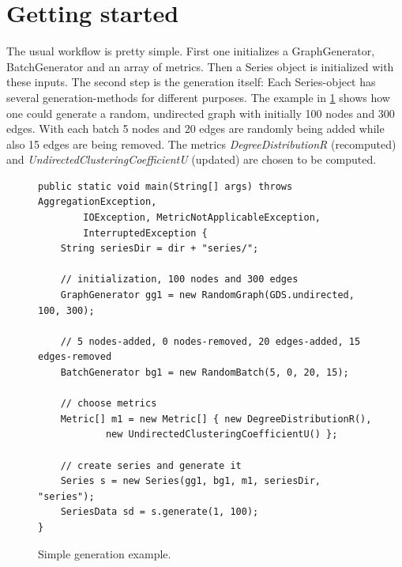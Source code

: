 \section{Getting started}
The usual workflow is pretty simple. First one initializes a GraphGenerator, BatchGenerator and an array of metrics. Then a Series object is initialized with these inputs. The second step is the generation itself: Each Series-object has several generation-methods for different purposes. The example in \ref{code:example1} shows how one could generate a random, undirected graph with initially 100 nodes and 300 edges. With each batch 5 nodes and 20 edges are randomly being added while also 15 edges are being removed. The metrics \textit{DegreeDistributionR} (recomputed) and \textit{UndirectedClusteringCoefficientU} (updated) are chosen to be computed. 

\begin{figure} [h]
\begin{lstlisting}
public static void main(String[] args) throws AggregationException,
		IOException, MetricNotApplicableException,
		InterruptedException {
	String seriesDir = dir + "series/";

	// initialization, 100 nodes and 300 edges
	GraphGenerator gg1 = new RandomGraph(GDS.undirected, 100, 300);
	
	// 5 nodes-added, 0 nodes-removed, 20 edges-added, 15 edges-removed
	BatchGenerator bg1 = new RandomBatch(5, 0, 20, 15);
	
	// choose metrics
	Metric[] m1 = new Metric[] { new DegreeDistributionR(),
			new UndirectedClusteringCoefficientU() };

	// create series and generate it
	Series s = new Series(gg1, bg1, m1, seriesDir, "series");
	SeriesData sd = s.generate(1, 100);
}
\end{lstlisting}
\caption{Simple generation example.}
\label{code:example1}
\end{figure}
